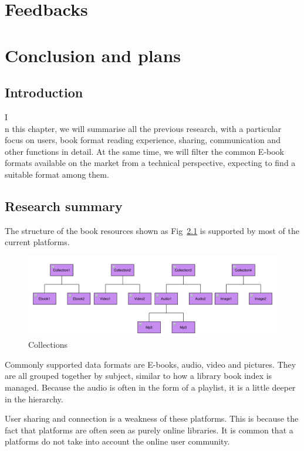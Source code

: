 \chapter{Feedbacks}


\chapter{Conclusion and plans}

\section{Introduction}
\lettrine[lines=2]{I}\\n this chapter, we will summarise all the previous research, with a particular focus on users, book format reading experience, sharing, communication and other functions in detail. 
At the same time, we will filter the common E-book formats available on the market from a technical perspective, expecting to find a suitable format among them.

\section{Research summary}

The structure of the book resources shown as Fig~\ref{fig30} is supported by most of the current platforms. 

\begin{figure}[htbp]
  \centerline{\includegraphics[width=500pt]{images/collections.png}}
  \caption{Collections}
  \label{fig30}
\end{figure}

Commonly supported data formats are E-books, audio, video and pictures. 
They are all grouped together by subject, similar to how a library book index is managed. 
Because the audio is often in the form of a playlist, it is a little deeper in the hierarchy. 

User sharing and connection is a weakness of these platforms.
This is because the fact that platforms are often seen as purely online libraries.
It is common that a platforms do not take into account the online user community.

